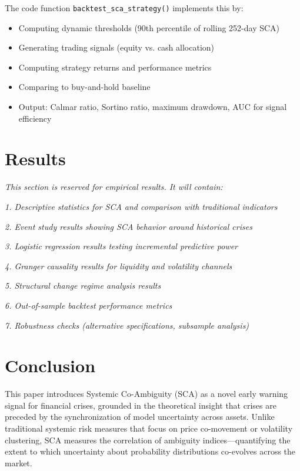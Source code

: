\documentclass[preprint,12pt,authoryear]{elsarticle}
\begin{document}
The code function \texttt{backtest\_sca\_strategy()} implements this by:
\begin{itemize}
\item Computing dynamic thresholds (90th percentile of rolling 252-day SCA)
\item Generating trading signals (equity vs. cash allocation)
\item Computing strategy returns and performance metrics
\item Comparing to buy-and-hold baseline
\item Output: Calmar ratio, Sortino ratio, maximum drawdown, AUC for signal efficiency
\end{itemize}

\section{Results}

\textit{This section is reserved for empirical results. It will contain:}

\textit{1. Descriptive statistics for SCA and comparison with traditional indicators}

\textit{2. Event study results showing SCA behavior around historical crises}

\textit{3. Logistic regression results testing incremental predictive power}

\textit{4. Granger causality results for liquidity and volatility channels}

\textit{5. Structural change regime analysis results}

\textit{6. Out-of-sample backtest performance metrics}

\textit{7. Robustness checks (alternative specifications, subsample analysis)}

\section{Conclusion}

This paper introduces Systemic Co-Ambiguity (SCA) as a novel early warning signal for financial crises, grounded in the theoretical insight that crises are preceded by the synchronization of model uncertainty across assets. Unlike traditional systemic risk measures that focus on price co-movement or volatility clustering, SCA measures the correlation of ambiguity indices—quantifying the extent to which uncertainty about probability distributions co-evolves across the market.
\end{document}
